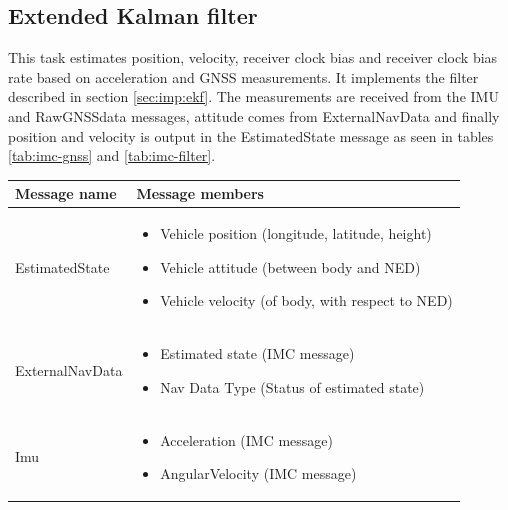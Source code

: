 \subsection{Extended Kalman filter}
    \label{sec:imp:ekf-dune}
    This task estimates position, velocity, receiver clock bias and receiver clock bias rate based on acceleration and GNSS measurements. It implements the filter described in section \ref{sec:imp:ekf}. The measurements are received from the IMU and RawGNSSdata messages, attitude comes from ExternalNavData and finally position and velocity is output in the EstimatedState message as seen in tables \ref{tab:imc-gnss} and \ref{tab:imc-filter}.\\
    
    \begin{table}[!htbp]
    \centering
    \begin{tabularx}{\textwidth}{ |l|X| }\hline
        \textbf{Message name}   & \textbf{Message members}  \\\hline
        EstimatedState & 
        \begin{minipage}[t]{0.7\textwidth}
            \begin{itemize}
                \item Vehicle position (longitude, latitude, height)
                \item Vehicle attitude (between body and NED)
                \item Vehicle velocity (of body, with respect to NED)
            \end{itemize}
        \end{minipage}\\\hline
        ExternalNavData & 
        \begin{minipage}[t]{0.7\textwidth}
            \begin{itemize}
                \item Estimated state (IMC message)
                \item Nav Data Type (Status of estimated state)
            \end{itemize}
        \end{minipage}\\\hline
        Imu &
        \begin{minipage}[t]{0.7\textwidth}
            \begin{itemize}
                \item Acceleration (IMC message)
                \item AngularVelocity (IMC message)

\end{itemize}
\end{minipage}
\end{tabularx}
\end{table}
